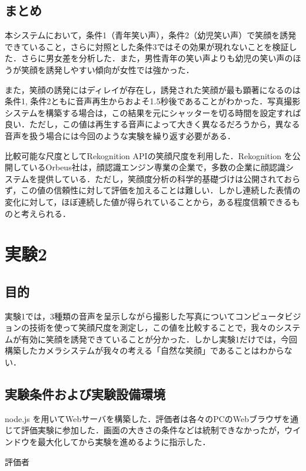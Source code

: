 \documentclass[submit,techreq]{ec2014}
\begin{document}
\subsection{まとめ}

本システムにおいて，条件1（青年笑い声），条件2（幼児笑い声）で笑顔を誘発できていること，さらに対照とした条件3ではその効果が現れないことを検証した．さらに男女差を分析した．また，男性青年の笑い声よりも幼児の笑い声のほうが笑顔を誘発しやすい傾向が女性では強かった．

また，笑顔の誘発にはディレイが存在し，誘発された笑顔が最も顕著になるのは条件1, 条件2ともに音声再生からおよそ1.5秒後であることがわかった．写真撮影システムを構築する場合は，この結果を元にシャッターを切る時間を設定すれば良い．ただし，この値は再生する音声によって大きく異なるだろうから，異なる音声を扱う場合には今回のような実験を繰り返す必要がある．

比較可能な尺度としてRekognition APIの笑顔尺度を利用した．Rekognition を公開しているOrbeus社は，顔認識エンジン専業の企業で，多数の企業に顔認識システムを提供している．ただし，笑顔度分析の科学的基礎づけは公開されておらず，この値の信頼性に対して評価を加えることは難しい．しかし連続した表情の変化に対して，ほぼ連続した値が得られていることから，ある程度信頼できるものと考えられる．

\section{実験2}

\subsection{目的}

実験1では，3種類の音声を呈示しながら撮影した写真についてコンピュータビジョンの技術を使って笑顔尺度を測定し，この値を比較することで，我々のシステムが有効に笑顔を誘発できていることが分かった．しかし実験1だけでは，今回構築したカメラシステムが我々の考える「自然な笑顔」であることはわからない．

\subsection{実験条件および実験設備環境}

node.js を用いてWebサーバを構築した．評価者は各々のPCのWebブラウザを通じて評価実験に参加した．画面の大きさの条件などは統制できなかったが，ウインドウを最大化してから実験を進めるように指示した．

評価者
\end{document}

